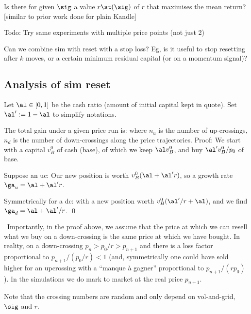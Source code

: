 \documentclass[oneside,10pt]{article}
\begin{document}
\QS[1] Is there for given $\sig$ a value $r\st(\sig)$ of $r$ that maximises the mean return? [similar to prior work done
for plain Kandle]

Todo: Try same experiments with multiple price points (not just 2)

Can we combine sim with reset with a stop loss? Eg, is it useful to stop resetting after $k$ moves,
or a certain minimum residual capital (or on a momentum signal)?



\subsection{Analysis of sim reset}

Let $\al\in[0,1]$ be the cash ratio (amount of initial capital kept in quote).
Set $\al':=1-\al$ to simplify notations.

\PRO 
The total gain under a given price run is:
where $n_u$ is the number of up-crossings, $n_d$
is the number of down-crossings along the price trajectories.
\ORP
Proof:
We start with a capital $v^0_B$ of cash (base),
of which we keep $\al v^0_B$, 
and buy $\al'v^0_B/p_0$ of base. 

Suppose an uc:
Our new position is worth $v^0_B(\al+ \al'r)$,
so a growth rate $\ga_u=\al+ \al'r$.

Symmetrically for a dc:
with a new position worth $v^0_B(\al'/r+\al )$, and we find $\ga_d=\al+ \al'/r$.
\qed

\NB\ Importantly, in the proof above, we assume that the price at which we can resell what we buy 
on a down-crossing is the same price at which we have bought. In reality, on a down-crossing
$p_n>p_0/r>p_{n+1}$ and there is a loss factor proportional to $p_{n+1}/(p_0/r)<1$ (and, symmetrically
one could have sold higher for an upcrossing with a ``manque à gagner'' proportional 
to $p_{n+1}/(rp_0)$). In the simulations we do mark to market at the real price $p_{n+1}$.

Note that the crossing numbers are random and only depend on vol-and-grid, $\sig$ and $r$.
\end{document}
